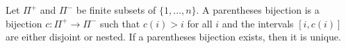 Let $\Pi^+$ and $\Pi^-$ be finite subsets of $\{1, \ldots, n\}$. A parentheses bijection is a bijection $c : \Pi^+ \to \Pi^-$ such that $c(i) > i$ for all $i$ and the intervals $[i, c(i)]$ are either disjoint or nested. If a parentheses bijection exists, then it is unique.
